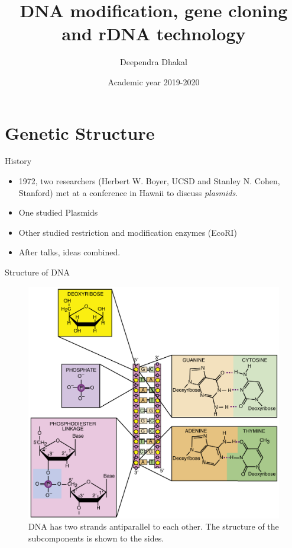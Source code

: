 \documentclass[
  ignorenonframetext,
  aspectratio=169]{beamer}
\title{DNA modification, gene cloning and rDNA technology}
\author{Deependra Dhakal}
\date{Academic year 2019-2020}
\institute{GAASC, Baitadi \and Tribhuwan University}
\providecommand{\tightlist}{%
  \setlength{\itemsep}{0pt}\setlength{\parskip}{0pt}}
\begin{document}
\frame{\titlepage}

\begin{frame}[allowframebreaks]
  \tableofcontents[hideallsubsections]
\end{frame}
\hypertarget{genetic-structure}{%
\section{Genetic Structure}\label{genetic-structure}}

\begin{frame}{History}
\protect\hypertarget{history}{}
\begin{itemize}
\tightlist
\item
  1972, two researchers (Herbert W. Boyer, UCSD and Stanley N. Cohen,
  Stanford) met at a conference in Hawaii to discuss \emph{plasmids}.
\item
  One studied Plasmids
\item
  Other studied restriction and modification enzymes (EcoRI)
\item
  After talks, ideas combined.
\end{itemize}
\end{frame}

\begin{frame}{Structure of DNA}
\protect\hypertarget{structure-of-dna}{}
\begin{figure}
\includegraphics[width=0.45\linewidth]{./../images/dna_structure_a} \caption{DNA has two strands antiparallel to each other. The structure of the subcomponents is shown to the sides.}\label{fig:nucleic-acid-dna}
\end{figure}
\end{frame}
\end{document}
